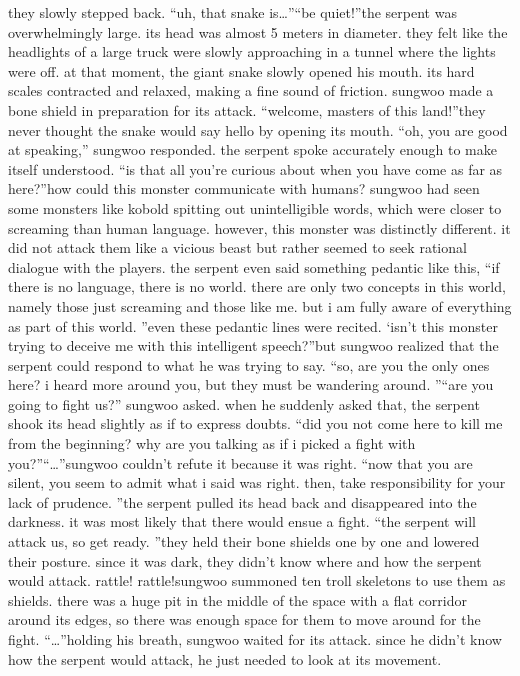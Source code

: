 they slowly stepped back.
“uh, that snake is…”“be quiet!”the serpent was overwhelmingly large.
 its head was almost 5 meters in diameter.
 they felt like the headlights of a large truck were slowly approaching in a tunnel where the lights were off.
at that moment, the giant snake slowly opened his mouth.
 its hard scales contracted and relaxed, making a fine sound of friction.
sungwoo made a bone shield in preparation for its attack.
“welcome, masters of this land!”they never thought the snake would say hello by opening its mouth.
“oh, you are good at speaking,” sungwoo responded.
the serpent spoke accurately enough to make itself understood.
“is that all you’re curious about when you have come as far as here?”how could this monster communicate with humans? sungwoo had seen some monsters like kobold spitting out unintelligible words, which were closer to screaming than human language.
however, this monster was distinctly different.
 it did not attack them like a vicious beast but rather seemed to seek rational dialogue with the players.
the serpent even said something pedantic like this, “if there is no language, there is no world.
 there are only two concepts in this world, namely those just screaming and those like me.
 but i am fully aware of everything as part of this world.
”even these pedantic lines were recited.
‘isn’t this monster trying to deceive me with this intelligent speech?”but sungwoo realized that the serpent could respond to what he was trying to say.
“so, are you the only ones here? i heard more around you, but they must be wandering around.
”“are you going to fight us?” sungwoo asked.
when he suddenly asked that, the serpent shook its head slightly as if to express doubts.
“did you not come here to kill me from the beginning? why are you talking as if i picked a fight with you?”“…”sungwoo couldn’t refute it because it was right.
“now that you are silent, you seem to admit what i said was right.
 then, take responsibility for your lack of prudence.
”the serpent pulled its head back and disappeared into the darkness.
it was most likely that there would ensue a fight.
“the serpent will attack us, so get ready.
”they held their bone shields one by one and lowered their posture.
 since it was dark, they didn’t know where and how the serpent would attack.
rattle! rattle!sungwoo summoned ten troll skeletons to use them as shields.
there was a huge pit in the middle of the space with a flat corridor around its edges, so there was enough space for them to move around for the fight.
“…”holding his breath, sungwoo waited for its attack.
 since he didn’t know how the serpent would attack, he just needed to look at its movement.
